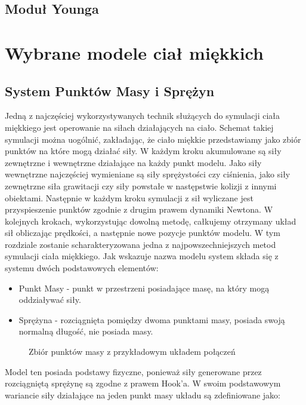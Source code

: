 \subsection{Moduł Younga}

\section{Wybrane modele ciał miękkich}


\subsection{System Punktów Masy i Sprężyn}

Jedną z najczęściej wykorzystywanych technik służących do symulacji ciała miękkiego jest operowanie na siłach działających na ciało. Schemat takiej symulacji można uogólnić, zakładając, że ciało miękkie przedstawiamy jako zbiór punktów na które mogą działać siły. W każdym kroku akumulowane są siły zewnętrzne i wewnętrzne działające na każdy punkt modelu. Jako siły wewnętrzne najczęściej wymieniane są siły sprężystości czy ciśnienia, jako siły zewnętrzne siła grawitacji czy siły powstałe w następstwie kolizji z innymi obiektami. Następnie w każdym kroku symulacji z sił wyliczane jest przyspieszenie punktów zgodnie z drugim prawem dynamiki Newtona. W kolejnych krokach, wykorzystując dowolną metodę, całkujemy otrzymany układ sił obliczając prędkości, a następnie nowe pozycje punktów modelu.\cite{pbdyn}
W tym rozdziale zostanie scharakteryzowana jedna z najpowszechniejszych metod symulacji ciała miękkiego. Jak wskazuje nazwa modelu system składa się z systemu  dwóch podstawowych elementów:
\begin{itemize}
\item  Punkt Masy - punkt w przestrzeni posiadające masę, na który mogą oddziaływać siły.
\item Sprężyna - rozciągnięta pomiędzy dwoma punktami masy, posiada swoją normalną długość, nie posiada masy.

\end{itemize} 

\begin{figure}[ht]
\centering

\caption{Zbiór punktów masy z przykładowym układem połączeń}
\end{figure}
Model ten posiada podstawy fizyczne, ponieważ siły generowane przez rozciągniętą sprężynę są zgodne z prawem Hook'a. W swoim podstawowym wariancie siły działające na jeden punkt masy układu są zdefiniowane jako:

